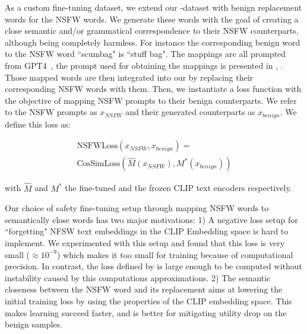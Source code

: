 As a custom fine-tuning dataset, we extend our \bench-dataset with benign replacement words for the NSFW words. We generate these words with the goal of creating a close semantic and/or grammatical correspondence to their NSFW counterparts, although being completely harmless. For instance the corresponding benign word to the NSFW word ``scumbag" is ``stuff bag". The mappings are all prompted from GPT4~\citep{OpenAI_ChatGPT_2024}, the prompt used for obtaining the mappings is presented in , . Those mapped words are then integrated into our \bench by replacing their corresponding NSFW words with them.
Then, we instantiate a loss function with the objective of mapping NSFW prompts to their benign counterparts. We refer to the NSFW prompts as $x_{NSFW}$ and their generated counterparts as $x_{benign}$. We define this loss as:

\begin{equation}
    \begin{aligned}
            \text{NSFWLoss}(x_{NSFW},x_{benign}) = \\
            \text{CosSimLoss}(\hat{M}(x_{NSFW}),M^*(x_{benign}))
    \end{aligned}
    \label{eq:loss}
\end{equation}

with $\hat{M}$ and $M^*$ the fine-tuned and the frozen CLIP text encoders respectively.

Our choice of safety fine-tuning setup through mapping NSFW words to semantically close words has two major motivations:
1) A negative loss setup for ``forgetting" NFSW text embeddings in the CLIP Embedding space is hard to implement. We experimented with this setup and found that  this loss is very small ($\approx 10^{-9}$)
which makes it too small for training because of computational precision. In contrast, the loss defined by  is large enough to be computed without instability caused by this computations approximations.
2) The semantic closeness between the NSFW word and its replacement aims at lowering the initial training loss by using the properties of the CLIP embedding space. This makes learning succeed faster, and is better for mitigating utility drop on the benign samples.
